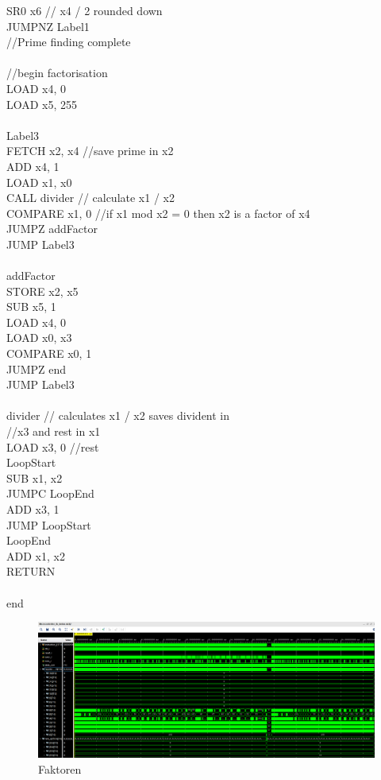 \documentclass[bibliography=totoc,listof=totoc,index=totoc]{scrartcl}
\begin{document}
\begin{multicols}{3}
\begin{small}
SR0 x6 // x4 / 2 rounded down\\
JUMPNZ Label1 \\
//Prime finding complete\\
\\
//begin factorisation\\
LOAD x4, 0\\
LOAD x5, 255\\
\\
Label3\\
FETCH x2, x4 //save prime in x2\\
ADD x4, 1\\
LOAD x1, x0\\
CALL divider // calculate x1 / x2\\
COMPARE x1, 0 //if x1 mod x2 = 0 then x2 is a factor of x4\\
JUMPZ addFactor\\
JUMP Label3\\
\\
addFactor\\
STORE x2, x5\\
SUB x5, 1\\
LOAD x4, 0\\
LOAD x0, x3\\
COMPARE x0, 1\\
JUMPZ end\\
JUMP Label3\\
\\
divider // calculates x1 / x2 saves divident in\\
//x3 and rest in x1\\
LOAD x3, 0 //rest\\
LoopStart\\
SUB x1, x2\\
JUMPC LoopEnd\\
ADD x3, 1\\
JUMP LoopStart\\
LoopEnd\\
ADD x1, x2\\
RETURN\\
\\
end\\
\end{small}
\end{multicols}
\begin{figure}[H]
    \centering
    \includegraphics[width=\textwidth]{Faktoren.png}
    \caption{Faktoren}
    \label{fig:Faktoren}
\end{figure}
\end{document}
